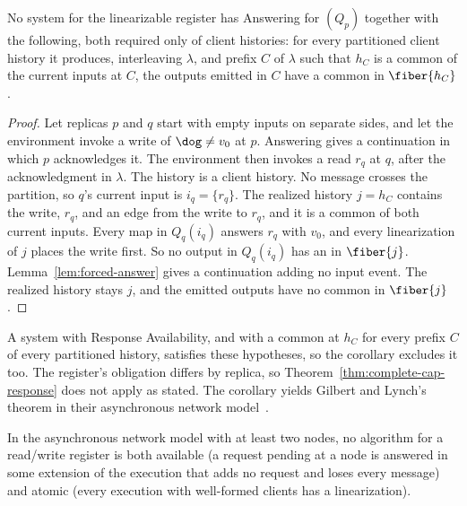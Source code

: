 \begin{corollary}
\label{cor:gilbert-lynch}
No system for the linearizable register has Answering for $(Q_p)$ together
with the following, both required only of client histories: for every
partitioned client history it produces, interleaving $\lambda$, and prefix $C$
of $\lambda$ such that $h_C$ is a common \indesc of the current inputs at $C$,
the outputs emitted in $C$ have a common \outnoun in $\fiber{h_C}$.
\end{corollary}

\begin{proof}
Let replicas $p$ and $q$ start with empty inputs on separate sides, and let
the environment invoke a write of $\dog\neq v_0$ at $p$.  Answering gives a
continuation in which $p$ acknowledges it.  The environment then invokes a read
$r_q$ at $q$, after the acknowledgment in $\lambda$.  The history is a client
history.  No message crosses the partition, so $q$'s current input is
$i_q=\{r_q\}$.  The realized history $j=h_C$ contains the write, $r_q$, and an
edge from the write to $r_q$, and it is a common \indesc of both current
inputs.  Every map in $Q_q(i_q)$ answers $r_q$ with $v_0$, and every
linearization of $j$ places the write first.  So no output in $Q_q(i_q)$ has
an \outnoun in $\fiber{j}$.  Lemma~\ref{lem:forced-answer} gives a
continuation adding no input event.  The realized history stays $j$, and the
emitted outputs have no common \outnoun in $\fiber{j}$.
\end{proof}

A system with Response Availability, and with a common \outnoun at $h_C$ for
every prefix $C$ of every partitioned history, satisfies these hypotheses, so
the corollary excludes it too.  The register's obligation differs by replica, so
Theorem~\ref{thm:complete-cap-response} does not apply as stated.  The
corollary yields Gilbert and Lynch's theorem in their asynchronous network
model~\cite{gilbert2002cap}.

\begin{proposition}
\label{prop:gl-async}
In the asynchronous network model with at least two nodes, no algorithm for a
read/write register is both available (a request pending at a node is
answered in some extension of the execution that adds no request and loses
every message) and atomic (every execution with well-formed clients has a
linearization).
\end{proposition}

